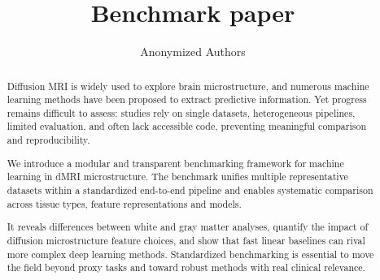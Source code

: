 \documentclass[runningheads]{llncs}
\begin{document}
%
\title{Benchmark paper}
%

\author{Anonymized Authors}  %
  
\maketitle              %
%
\begin{abstract}
Diffusion MRI is widely used to explore brain microstructure, and numerous machine learning methods have been proposed to extract predictive information. Yet progress remains difficult to assess: studies rely on single datasets, heterogeneous pipelines, limited evaluation, and often lack accessible code, preventing meaningful comparison and reproducibility.

We introduce a modular and transparent benchmarking framework for machine learning in dMRI microstructure. The benchmark unifies multiple representative datasets within a standardized end-to-end pipeline and enables systematic comparison across tissue types, feature representations and models.

It reveals differences between white and gray matter analyses, quantify the impact of diffusion microstructure feature choices, and show that fast linear baselines can rival more complex deep learning methods. Standardized benchmarking is essential to move the field beyond proxy tasks and toward robust methods with real clinical relevance.

\end{abstract}
%
%
%

\end{document}
